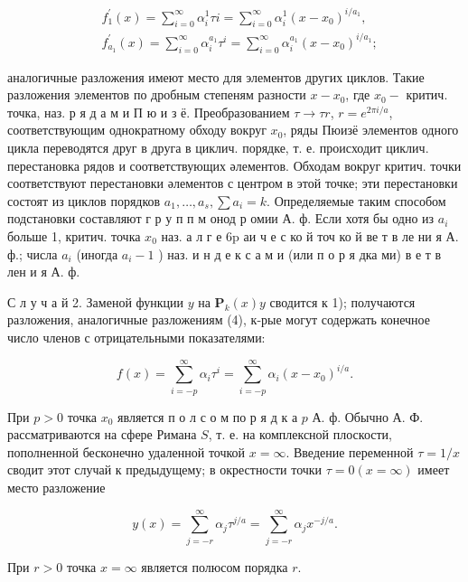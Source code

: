 \documentclass[10pt]{article}
\begin{document}
\[

\begin{aligned}

& f_{1}^{\prime}(x)=\sum_{i=0}^{\infty} \alpha_{i}^{1} \tau i=\sum_{i=0}^{\infty} \alpha_{i}^{1}\left(x-x_{0}\right)^{i / a_{1}}, \\

& f_{a_{1}}^{\prime}(x)=\sum_{i=0}^{\infty} \alpha_{i}^{a_{1}} \tau^{i}=\sum_{i=0}^{\infty} \alpha_{i}^{a_{1}}\left(x-x_{0}\right)^{i / a_{1}} ;

\end{aligned}

\]



аналогичные разложения имеют место для элементов других циклов. Такие разложения элементов по дробным степеням разности $x-x_{0}$, где $x_{0}-$ критич. точка, наз. р я д а м и П ю и з ё. Преобразованием $\tau \rightarrow \tau r$, $r=e^{2 \pi i / a}$, соответствующим однократному обходу вокруг $x_{0}$, ряды Пюизё элементов одного цикла переводятся друг в друга в циклич. порядке, т. е. происходит циклич. перестановка рядов и соответствующих әлементов. Обходам вокруг критич. точки соответствуют перестановки әлементов с центром в этой точке; эти перестановки состоят из циклов порядков $a_{1}, \ldots, a_{s}, \sum a_{i}=k$. Определяемые таким способом подстановки составляют $г$ р у п п м онод р омии А. ф. Если хотя бы одно из $a_{i}$ больше 1, критич. точка $x_{0}$ наз. а л г е $6 \mathrm{p}$ аи ч е с ко й точ ко й ве т в ле ни я А. ф.; числа $a_{i}$ (иногда $a_{i}-1$ ) наз. и н д е к с а м и (или п о р я дка ми) в е т в лен и я А. ф.



С л у ч а й 2. Заменой функции $y$ на $\boldsymbol{P}_{k}(x) y$ сводится к 1); получаются разложения, аналогичные разложениям (4), к-рые могут содержать конечное число членов с отрицательными показателями:



\[

f(x)=\sum_{i=-p}^{\infty} \alpha_{i} \tau^{i}=\sum_{i=-p}^{\infty} \alpha_{i}\left(x-x_{0}\right)^{i / a} .

\]



При $p>0$ точка $x_{0}$ является п о л с о м по р я д к а $p$ А. ф. Обычно А. Ф. рассматриваются на сфере Римана $S$, т. е. на комплексной плоскости, пополненной бесконечно удаленной точкой $x=\infty$. Введение переменной $\tau=1 / x$ сводит этот случай к предыдущему; в окрестности точки $\tau=0(x=\infty)$ имеет место разложение



\[

y(x)=\sum_{j=-r}^{\infty} \alpha_{j} \tau^{j / a}=\sum_{j=-r}^{\infty} \alpha_{j} x^{-j / a} .

\]



При $r>0$ точка $x=\infty$ является полюсом порядка $r$.
\end{document}
